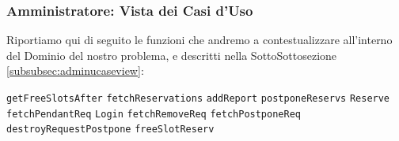 

\subsubsection{Amministratore: Vista dei Casi d'Uso}
Riportiamo qui di seguito le funzioni che andremo a contestualizzare all'interno
del Dominio del nostro problema, e descritti nella SottoSottosezione \vref{subsubsec:adminucaseview}:
\begin{itemize}
\diam \texttt{getFreeSlotsAfter}
\diam \texttt{fetchReservations}
\diam \texttt{addReport}
\diam \texttt{postponeReservs}
\diam \texttt{Reserve}
\diam \texttt{fetchPendantReq}
\diam \texttt{Login}
\diam \texttt{fetchRemoveReq}
\diam \texttt{fetchPostponeReq}
\diam \texttt{destroyRequestPostpone}
\diam \texttt{freeSlotReserv}
\end{itemize}



